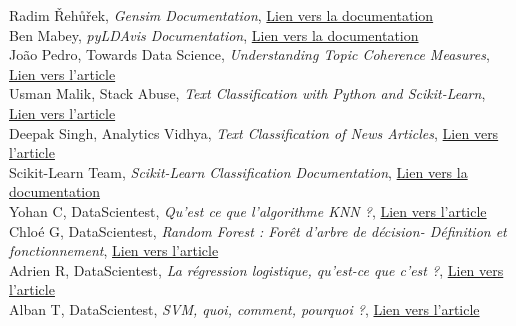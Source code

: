 \documentclass[a4paper,french,12pt]{article}
\begin{document}
\begin{thebibliography}{9}
    Radim Řehůřek, \textit{Gensim Documentation}, \href{https://radimrehurek.com/gensim/auto_examples/index.html#documentation}{Lien vers la documentation}\\
    
    Ben Mabey, \textit{pyLDAvis Documentation}, \href{https://pyldavis.readthedocs.io/en/latest/}{Lien vers la documentation}\\
    
    João Pedro, Towards Data Science, \textit{Understanding Topic Coherence Measures}, \href{https://towardsdatascience.com/understanding-topic-coherence-measures-4aa41339634c}{Lien vers l'article}\\
    
    Usman Malik, Stack Abuse, \textit{Text Classification with Python and Scikit-Learn}, \href{https://stackabuse.com/text-classification-with-python-and-scikit-learn/}{Lien vers l'article}\\
    
    Deepak Singh, Analytics Vidhya, \textit{Text Classification of News Articles}, \href{https://www.analyticsvidhya.com/blog/2021/12/text-classification-of-news-articles/}{Lien vers l'article}\\
    
    Scikit-Learn Team, \textit{Scikit-Learn Classification Documentation}, \href{https://scikit-learn.org/stable/supervised_learning.html#supervised-learning}{Lien vers la documentation}\\
    
    Yohan C, DataScientest, \textit{Qu’est ce que l’algorithme KNN ?}, \href{https://datascientest.com/knn}{Lien vers l'article}\\
    
    Chloé G, DataScientest, \textit{Random Forest : Forêt d’arbre de décision- Définition et fonctionnement}, \href{https://datascientest.com/random-forest-definition}{Lien vers l'article}\\
    
    Adrien R, DataScientest, \textit{La régression logistique, qu’est-ce que c’est ?}, \href{https://datascientest.com/regression-logistique-quest-ce-que-cest}{Lien vers l'article}\\
    
    Alban T, DataScientest, \textit{SVM, quoi, comment, pourquoi ?}, \href{https://datascientest.com/svm}{Lien vers l'article}\\
    

\end{thebibliography}
\end{document}
